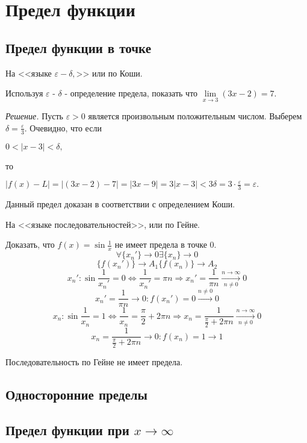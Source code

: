 \documentclass[14pt]{extreport}
\begin{document}
\chapter{Предел функции}

\section{Предел функции в точке}
\begin{example}

На <<языке $\varepsilon - \delta,$>> или по Коши.

Используя $\varepsilon$ - $\delta$ - определение предела, показать что $\lim\limits_{x \to 3}(3x-2)=7.$

\emph{Решение.}
 Пусть $\varepsilon>0$ является произвольным положительным числом. Выберем $\delta=\frac{\varepsilon}{3}.$ Очевидно, что если 

$0<|x-3|<\delta,$

 то

$|f(x)-L|=|(3x-2)-7|=|3x-9|=3|x-3|<3\delta=3\cdot\frac{\varepsilon}{3}=\varepsilon.$

Данный предел доказан в соответствии с определением Коши.

\end{example}

\begin{example}
На <<языке последовательностей>>, или по Гейне.

Доказать, что $f(x)=\sin\frac{1}{x}$ не имеет предела в точке $0$.
$$\forall\{x_n'\}\rightarrow 0\exists\{x_n\} \rightarrow0$$
$$\{f(x_n')\}\rightarrow A_1\{f(x_n)\}\rightarrow A_2$$
$$x_n':\sin\frac{1}{x_n'}=0\Leftrightarrow\frac{1}{x_n'}=\pi n\Longrightarrow x_n'=\frac{1}{\pi n} \xrightarrow[n\neq 0]{n\rightarrow \infty}0$$
$$x_n'=\frac{1}{\pi n}\rightarrow0:f(x_n')=0\xrightarrow{n\neq0}0$$
$$x_n:\sin\frac{1}{x_n}=1\Leftrightarrow\frac{1}{x_n}=\frac{\pi}{2}+2\pi n \Longrightarrow x_n=\frac{1}{\frac{\pi}{2}+2\pi n}\xrightarrow[n\neq0]{n\rightarrow\infty}0$$
$$x_n=\frac{1}{\frac{\pi}{2}+2\pi n}\rightarrow0:f(x_n)=1\rightarrow1$$

Последовательность по Гейне не имеет предела.
\end{example}

\section{Односторонние пределы}

\section{Предел функции при $x\to\infty$}
\end{document}
